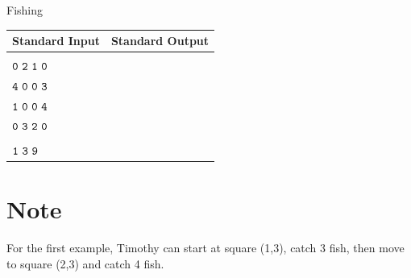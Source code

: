 \documentclass{xcpc}
\begin{document}
\begin{problem}{Fishing}
	\begin{table}[h]
		\begin{tabularx}{\textwidth}{|>{\raggedright\arraybackslash}X|>{\raggedright\arraybackslash}X|}
			\hline
			\textbf{Standard Input} & \textbf{Standard Output} \\ \hline
		\makecell[l]{$\tt{4\ 4}$\\$\tt{0\ 2\ 1\ 0}$\\$\tt{4\ 0\ 0\ 3}$\\$\tt{1\ 0\ 0\ 4}$\\$\tt{0\ 3\ 2\ 0}$} & \makecell[l]{$\tt{7}$} \\ \hline
		\makecell[l]{$\tt{1\ 3}$\\$\tt{1\ 3\ 9}$} & \makecell[l]{$\tt{13}$} \\ \hline
		\end{tabularx}
	\end{table}
	
	\section*{Note}
	
	For the first example, Timothy can start at square (1,3), catch 3 fish, then move to square (2,3) and catch 4 fish.
	\end{problem}
\end{document}
